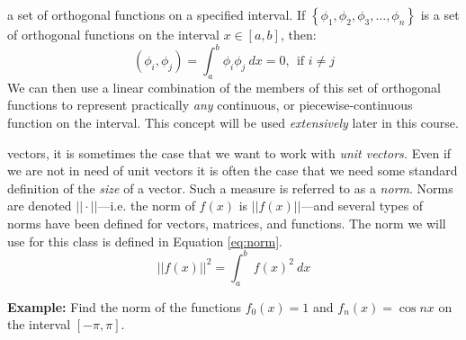  a set of orthogonal functions on a specified interval.  If $\left\{ \phi_1,\phi_2,\phi_3,\dots,\phi_n\right\}$ is a set of orthogonal functions on the interval $x\in[a,b]$, then:
\begin{equation*}
\left(\phi_i, \phi_j\right) = \int_{a}^{b} \phi_i \phi_j \ dx = 0, \ \ \text{if } i \ne j
\end{equation*}
We can then use a linear combination of the members of this set of orthogonal functions to represent practically \emph{any} continuous, or piecewise-continuous function on the interval.  This concept will be used \emph{extensively} later in this course.

 vectors, it is sometimes the case that we want to work with \emph{unit vectors.} Even if we are not in need of unit vectors it is often the case that we need some standard definition of the \emph{size} of a vector. Such a measure is referred to as a \emph{norm}.  Norms are denoted $||\cdot||$---i.e. the norm of $f(x)$ is $||f(x)||$---and several types of norms have been defined for vectors, matrices, and functions.  The norm we will use for this class is defined in Equation \ref{eq:norm}.
\begin{equation}
||f(x)||^2 = \int_{a}^{b} \ f(x)^2 \ dx
\label{eq:norm}
\end{equation}  

\vspace{0.5cm}

\noindent\textbf{Example:} Find the norm of the functions $f_0(x)=1$ and $f_n(x)=\cos{nx}$ on the interval $[-\pi,\pi]$.

\vspace{0.25cm}


